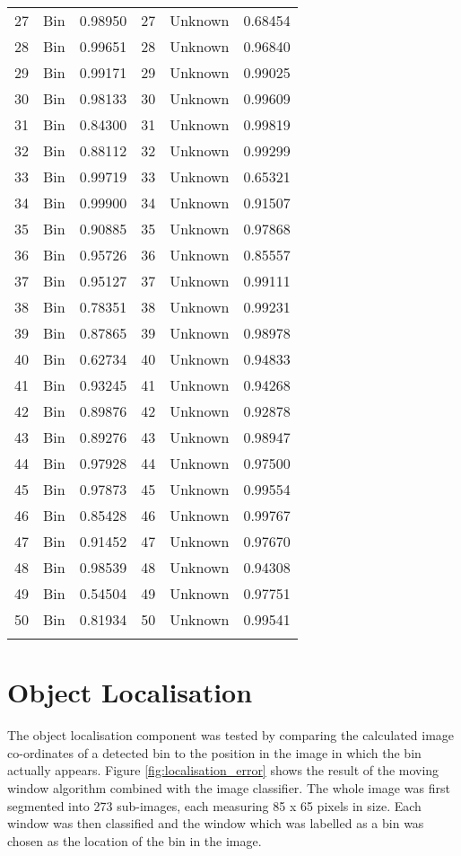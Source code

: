 \begin{table}[H]
\begin{tabular}{c l c | c l c}
27 & Bin & 0.98950 & 27 & Unknown & 0.68454 \\
28 & Bin & 0.99651 & 28 & Unknown & 0.96840 \\
29 & Bin & 0.99171 & 29 & Unknown & 0.99025 \\
30 & Bin & 0.98133 & 30 & Unknown & 0.99609 \\
31 & Bin & 0.84300 & 31 & Unknown & 0.99819 \\
32 & Bin & 0.88112 & 32 & Unknown & 0.99299 \\
33 & Bin & 0.99719 & 33 & Unknown & 0.65321 \\
34 & Bin & 0.99900 & 34 & Unknown & 0.91507 \\
35 & Bin & 0.90885 & 35 & Unknown & 0.97868 \\
36 & Bin & 0.95726 & 36 & Unknown & 0.85557 \\
37 & Bin & 0.95127 & 37 & Unknown & 0.99111 \\
38 & Bin & 0.78351 & 38 & Unknown & 0.99231 \\
39 & Bin & 0.87865 & 39 & Unknown & 0.98978 \\
40 & Bin & 0.62734 & 40 & Unknown & 0.94833 \\
41 & Bin & 0.93245 & 41 & Unknown & 0.94268 \\
42 & Bin & 0.89876 & 42 & Unknown & 0.92878 \\
43 & Bin & 0.89276 & 43 & Unknown & 0.98947 \\
44 & Bin & 0.97928 & 44 & Unknown & 0.97500 \\
45 & Bin & 0.97873 & 45 & Unknown & 0.99554 \\
46 & Bin & 0.85428 & 46 & Unknown & 0.99767 \\
47 & Bin & 0.91452 & 47 & Unknown & 0.97670 \\
48 & Bin & 0.98539 & 48 & Unknown & 0.94308 \\
49 & Bin & 0.54504 & 49 & Unknown & 0.97751 \\
50 & Bin & 0.81934 & 50 & Unknown & 0.99541 \\
\bottomrule\\
\end{tabular}
\end{table}

\section{Object Localisation}
The object localisation component was tested by comparing the calculated image co-ordinates of a detected bin to the position in the image in which the bin actually appears. Figure \ref{fig:localisation_error} shows the result of the moving window algorithm combined with the image classifier. The whole image was first segmented into 273 sub-images, each measuring 85 x 65 pixels in size. Each window was then classified and the window which was labelled as a bin was chosen as the location of the bin in the image.

